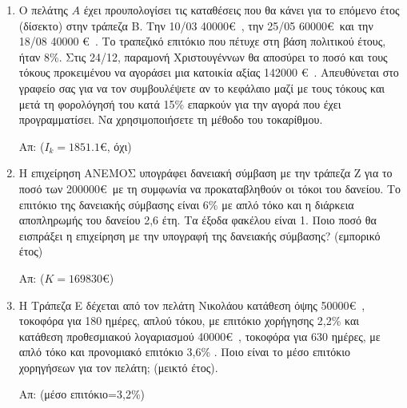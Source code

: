 \documentclass[a4paper,12pt]{article}
\begin{document}
\begin{enumerate}
 \item Ο πελάτης $A$ έχει προυπολογίσει τις καταθέσεις που θα κάνει για το επόμενο έτος (δίσεκτο) στην τράπεζα B. Την 10/03 40000\euro\ , την 25/05 60000\euro\ και την 18/08 40000 \euro\ . Το τραπεζικό επιτόκιο που πέτυχε στη βάση πολιτικού έτους, ήταν 8\%. Στις 24/12, παραμονή Χριστουγέννων θα αποσύρει το ποσό και τους τόκους προκειμένου να αγοράσει μια κατοικία αξίας 142000 \euro\ . Απευθύνεται στο γραφείο σας για να τον συμβουλέψετε αν το κεφάλαιο μαζί με τους τόκους και μετά τη φορολόγησή του κατά 15\% επαρκούν για την αγορά που έχει προγραμματίσει. Να χρησιμοποιήσετε τη μέθοδο του τοκαρίθμου.

\hfill Απ: ($I_k=1851.1$\euro, όχι)

\item Η επιχείρηση ΑΝΕΜΟΣ υπογράφει δανειακή σύμβαση με την τράπεζα Ζ για το ποσό των 200000\euro\ με τη συμφωνία να προκαταβληθούν οι τόκοι του δανείου. Το επιτόκιο της δανειακής σύμβασης είναι 6\% με απλό τόκο και η διάρκεια αποπληρωμής του δανείου 2,6 έτη. Τα έξοδα φακέλου είναι 1\textperthousand . Ποιο ποσό θα εισπράξει η επιχείρηση με την υπογραφή της δανειακής σύμβασης? (εμπορικό έτος)

\hfill Απ: ($K=169830$\euro)

\item Η Τράπεζα Ε δέχεται από τον πελάτη Νικολάου κατάθεση όψης 50000\euro\ , τοκοφόρα για 180 ημέρες, απλού τόκου, με επιτόκιο χορήγησης 2,2\% και κατάθεση προθεσμιακού λογαριασμού 40000\euro\ , τοκοφόρα για 630 ημέρες, με απλό τόκο και προνομιακό επιτόκιο 3,6\% . Ποιο είναι το μέσο επιτόκιο χορηγήσεων για τον πελάτη; (μεικτό έτος).

\hfill Απ: (μέσο επιτόκιο=3,2\%)

\end{enumerate}
\end{document}
